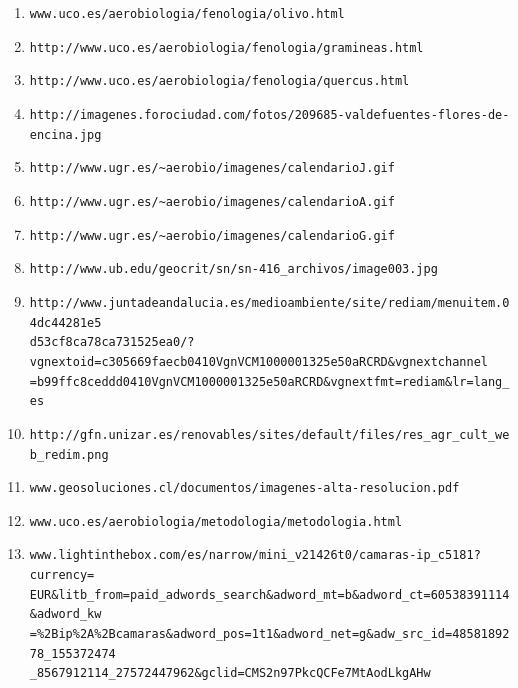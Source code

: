 \documentclass[12pt,oneside,a4paper]{article}
\numberwithin{figure}{section}
\begin{document}
\begin{enumerate}

\item \verb|www.uco.es/aerobiologia/fenologia/olivo.html|
\label{ref:uco1}

\item \verb|http://www.uco.es/aerobiologia/fenologia/gramineas.html|
\label{ref:uco2}

\item \verb|http://www.uco.es/aerobiologia/fenologia/quercus.html|
\label{ref:uco3}

\item \verb|http://imagenes.forociudad.com/fotos/209685-valdefuentes-flores-de-encina.jpg|
\label{ref:flor_encina}

\item \verb|http://www.ugr.es/~aerobio/imagenes/calendarioJ.gif|
\label{ref:calen_J}

\item \verb|http://www.ugr.es/~aerobio/imagenes/calendarioA.gif|
\label{ref:calen_A}

\item \verb|http://www.ugr.es/~aerobio/imagenes/calendarioG.gif|
\label{ref:calen_G}

\item \verb|http://www.ub.edu/geocrit/sn/sn-416_archivos/image003.jpg|
\label{ref:especies_andalucia}

\item \verb|http://www.juntadeandalucia.es/medioambiente/site/rediam/menuitem.04dc44281e5|
\\ \verb|d53cf8ca78ca731525ea0/?vgnextoid=c305669faecb0410VgnVCM1000001325e50aRCRD&vgnextchannel|
\\ \verb|=b99ffc8ceddd0410VgnVCM1000001325e50aRCRD&vgnextfmt=rediam&lr=lang_es|
\label{ref:gram_andalucia}

\item \verb|http://gfn.unizar.es/renovables/sites/default/files/res_agr_cult_web_redim.png|
\label{ref:trigo_andalucia}

\item \verb|www.geosoluciones.cl/documentos/imagenes-alta-resolucion.pdf|
\label{ref:Charlie}

\item \verb|www.uco.es/aerobiologia/metodologia/metodologia.html|
\label{ref:metodologia}

\item \verb|www.lightinthebox.com/es/narrow/mini_v21426t0/camaras-ip_c5181?currency=|
\\ \verb|EUR&litb_from=paid_adwords_search&adword_mt=b&adword_ct=60538391114&adword_kw|
\\ \verb|=%2Bip%2A%2Bcamaras&adword_pos=1t1&adword_net=g&adw_src_id=4858189278_155372474|
\\ \verb|_8567912114_27572447962&gclid=CMS2n97PkcQCFe7MtAodLkgAHw |
\label{cam_mini}


\end{enumerate}
\end{document}
